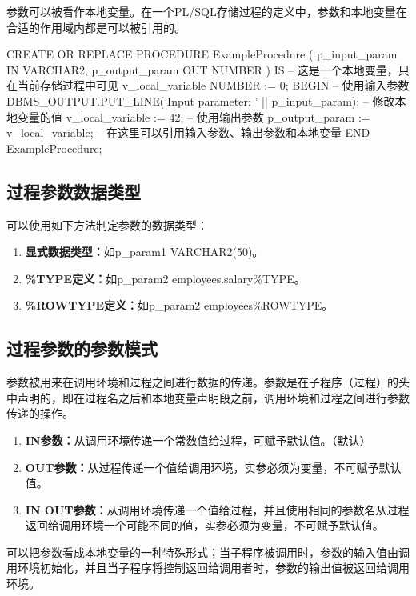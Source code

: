 \documentclass[11pt, a4paper, oneside, UTF8]{ctexbook}
\let\kaishu\relax %
\begin{document}
参数可以被看作本地变量。在一个PL/SQL存储过程的定义中，参数和本地变量在合适的作用域内都是可以被引用的。

\begin{plsql}[caption=创建过程示例代码]
CREATE OR REPLACE PROCEDURE ExampleProcedure (
 p_input_param IN VARCHAR2,
 p_output_param OUT NUMBER
) IS
  -- 这是一个本地变量，只在当前存储过程中可见
  v_local_variable NUMBER := 0;
BEGIN
  -- 使用输入参数
  DBMS_OUTPUT.PUT_LINE('Input parameter: ' || p_input_param);
  -- 修改本地变量的值
  v_local_variable := 42;
  -- 使用输出参数
  p_output_param := v_local_variable;
  -- 在这里可以引用输入参数、输出参数和本地变量
END ExampleProcedure;
\end{plsql}

\subsection{过程参数数据类型}
可以使用如下方法制定参数的数据类型：
\begin{enumerate}
  \item {\bfseries\kaishu 显式数据类型：}如p\_param1 VARCHAR2(50)。
  \item {\bfseries\kaishu \%TYPE定义：}如p\_param2 employees.salary\%TYPE。
  \item {\bfseries\kaishu \%ROWTYPE定义：}如p\_param2 employees\%ROWTYPE。
\end{enumerate}

\subsection{过程参数的参数模式}

参数被用来在调用环境和过程之间进行数据的传递。参数是在子程序（过程）的头中声明的，即在过程名之后和本地变量声明段之前，调用环境和过程之间进行参数传递的操作。

\begin{enumerate}
  \item {\bfseries\kaishu IN参数：}从调用环境传递一个常数值给过程，可赋予默认值。（默认）
  \item {\bfseries\kaishu OUT参数：}从过程传递一个值给调用环境，实参必须为变量，不可赋予默认值。
  \item {\bfseries\kaishu IN OUT参数：}从调用环境传递一个值给过程，并且使用相同的参数名从过程返回给调用环境一个可能不同的值，实参必须为变量，不可赋予默认值。
\end{enumerate}

可以把参数看成本地变量的一种特殊形式；当子程序被调用时，参数的输入值由调用环境初始化，并且当子程序将控制返回给调用者时，参数的输出值被返回给调用环境。
\end{document}
